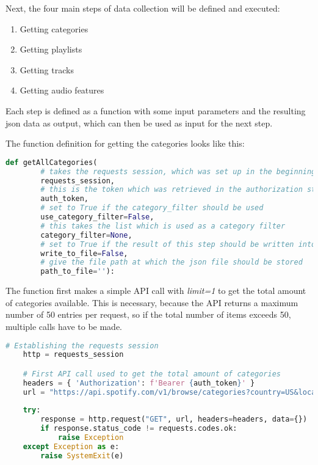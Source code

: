 Next, the four main steps of data collection will be defined and executed:

\begin{enumerate}
    \item Getting categories
    \item Getting playlists
    \item Getting tracks
    \item Getting audio features
\end{enumerate}

Each step is defined as a function with some input parameters and the resulting json data as output, which can then
be used as input for the next step.

The function definition for getting the categories looks like this:

\begin{lstlisting}[language=Python]
    def getAllCategories(
        # takes the requests session, which was set up in the beginning
        requests_session,
        # this is the token which was retrieved in the authorization step
        auth_token,
        # set to True if the category_filter should be used
        use_category_filter=False, 
        # this takes the list which is used as a category filter
        category_filter=None,  
        # set to True if the result of this step should be written into a json file
        write_to_file=False, 
        # give the file path at which the json file should be stored
        path_to_file=''): 
\end{lstlisting}

The function first makes a simple API call with \emph{limit=1} to get the total amount of categories available.
This is necessary, because the API returns a maximum number of 50 entries per request, so if the total number of
items exceeds 50, multiple calls have to be made.

\begin{lstlisting}[language=Python]
    # Establishing the requests session
    http = requests_session

    # First API call used to get the total amount of categories
    headers = { 'Authorization': f'Bearer {auth_token}' }
    url = "https://api.spotify.com/v1/browse/categories?country=US&locale=en_US&limit=1"
    
    try:
        response = http.request("GET", url, headers=headers, data={})
        if response.status_code != requests.codes.ok:
            raise Exception
    except Exception as e:
        raise SystemExit(e)
\end{lstlisting}

